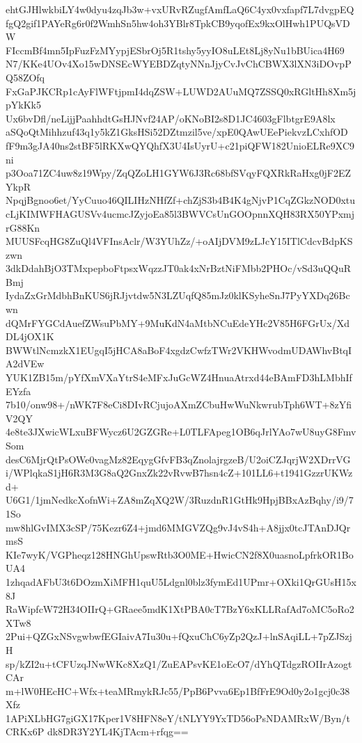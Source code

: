 ehtGJHlwkbiLY4w0dyu4zqJb3w+vxURvRZugfAmfLaQ6C4yx0vxfapf7L7dvgpEQ
fgQ2gif1PAYeRg6r0f2WmhSn5hw4oh3YBlr8TpkCB9yqofEx9kxOlHwh1PUQsVDW
FIccmBf4mn5IpFuzFzMYypjESbrOj5R1tshy5yyIO8uLEt8Lj8yNu1bBUica4H69
N7/KKe4UOv4Xo15wDNSEcWYEBDZqtyNNnJjyCvJvChCBWX3lXN3iDOvpPQ58ZOfq
FxGaPJKCRp1cAyFlWFtjpmI4dqZSW+LUWD2AUuMQ7ZSSQ0xRGltHh8Xm5jpYkKk5
Ux6bvDfl/neLijjPaahhdtGsHJNvf24AP/oKNoBI2s8D1JC4603gFlbtgrE9A8lx
aSQoQtMihhzuf43q1y5kZ1GksHSi52DZtmzil5ve/xpE0QAwUEePiekvzLCxhfOD
fF9m3gJA40ns2stBF5lRKXwQYQhfX3U4IsUyrU+c21piQFW182UnioELRe9XC9ni
p3Ooa71ZC4uw8z19Wpy/ZqQZoLH1GYW6J3Rc68bfSVqyFQXRkRaHxg0jF2EZYkpR
NpqjBgnoo6et/YyCuuo46QILIHzNHfZf+chZjS3b4B4K4gNjvP1CqZGkzNOD0xtu
cLjKIMWFHAGUSVv4ucmcJZyjoEa85l3BWVCsUnGOOpnnXQH83RX50YPxmjrG88Kn
MUUSFcqHG8ZuQl4VFInsAclr/W3YUhZz/+oAIjDVM9zLJcY15ITlCdcvBdpKSzwn
3dkDdahBjO3TMxpepboFtpsxWqzzJT0ak4xNrBztNiFMbb2PHOc/vSd3uQQuRBmj
IydaZxGrMdbhBnKUS6jRJjvtdw5N3LZUqfQ85mJz0klKSyheSnJ7PyYXDq26Bcwn
dQMrFYGCdAuefZWsuPbMY+9MuKdN4aMtbNCuEdeYHc2V85H6FGrUx/XdDL4jOX1K
BWWtlNcmzkX1EUgqI5jHCA8aBoF4xgdzCwfzTWr2VKHWvodmUDAWhvBtqIA2dVEw
YUK1ZB15m/pYfXmVXaYtrS4eMFxJuGcWZ4HnuaAtrxd44eBAmFD3hLMbhIfEYzfa
7b10/onw98+/nWK7F8eCi8DIvRCjujoAXmZCbuHwWuNkwrubTph6WT+8zYfiV2QY
4e8te3JXwicWLxuBFWycz6U2GZGRe+L0TLFApeg1OB6qJrlYAo7wU8uyG8FmvSom
desC6MjrQtPsOWe0vagMz82EqygGfvFB3qZnolajrgzeB/U2oiCZJqrjW2XDrrVG
i/WPlqkaS1jH6R3M3G8aQ2GnxZk22vRvwB7hsn4cZ+101LL6+t1941GzzrUKWzd+
U6G1/1jmNedkcXofnWi+ZA8mZqXQ2W/3RuzdnR1GtHk9HpjBBxAzBqhy/i9/71So
mw8hlGvIMX3cSP/75Kezr6Z4+jmd6MMGVZQg9vJ4vS4h+A8jjx0tcJTAnDJQrmsS
KIe7wyK/VGPheqz128HNGhUpswRtb3O0ME+HwicCN2f8X0uasnoLpfrkOR1BoUA4
1zhqadAFbU3t6DOzmXiMFH1quU5Ldgnl0blz3fymEd1UPmr+OXki1QrGUsH15x8J
RaWipfcW72H34OIIrQ+GRaee5mdK1XtPBA0cT7BzY6xKLLRafAd7oMC5oRo2XTw8
2Pui+QZGxNSvgwbwfEGIaivA7Iu30u+fQxuChC6yZp2QzJ+lnSAqiLL+7pZJSzjH
sp/kZI2u+tCFUzqJNwWKc8XzQ1/ZuEAPsvKE1oEcO7/dYhQTdgzROIIrAzogtCAr
m+lW0HEcHC+Wfx+teaMRmykRJc55/PpB6Pvva6Ep1BfFrE9Od0y2o1gcj0c38Xfz
1APiXLbHG7giGX17Kper1V8HFN8eY/tNLYY9YxTD56oPsNDAMRxW/Byn/tCRKx6P
dk8DR3Y2YL4KjTAcm+rfqg==

